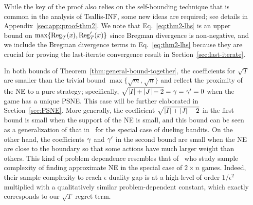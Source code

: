 {\begin{theorem}
\begin{itemize}[leftmargin=*]
\end{itemize}

\end{theorem}



While the key of the proof also relies on the self-bounding technique that is common in the analysis of Tsallis-INF,
some new ideas are required; see details in Appendix~\ref{sec:app:proof-thm2}.
We note that Eq.~\eqref{eq:thm2-lhs} is an upper bound on $\max\{\mathrm{Reg}_T(x), \mathrm{Reg}'_T(x)\}$ since Bregman divergence is non-negative,
and we include the Bregman divergence terms in Eq.~\eqref{eq:thm2-lhs} because they are crucial for proving the last-iterate convergence result in Section~\ref{sec:last-iterate}.

In both bounds of Theorem~\ref{thm:general-bound-together}, the coefficients for $\sqrt{T}$ are smaller than the trivial bound $\max\{\sqrt{m}, \sqrt{n}\}$ and reflect the proximity of the NE to a pure strategy; specifically, $\sqrt{\abs{I}+\abs{J}-2}=\gammar=\gammac=0$ when the game has a unique PSNE. This case will be further elaborated in Section~\ref{sec:PSNE}.
More generally, the coefficient $\sqrt{\abs{I}+\abs{J}-2}$ in the first bound is small when the support of the NE is small, and this bound can be seen as a generalization of that in~\citet{balsubramani2016instance} for the special case of dueling bandits.
On the other hand, the coefficients $\gamma$ and $\gamma'$ in the second bound are small when the NE are close to the boundary so that some actions have much larger weight than others.
This kind of problem dependence resembles that of~\citet{maiti2023instance} who study sample complexity of finding approximate NE in the special case of $2\times n$ games.
Indeed, their sample complexity to reach $\epsilon$ duality gap is at a high-level of order $1/\epsilon^2$ multiplied with a qualitatively similar problem-dependent constant, which exactly corresponds to our $\sqrt{T}$ regret term.

}
